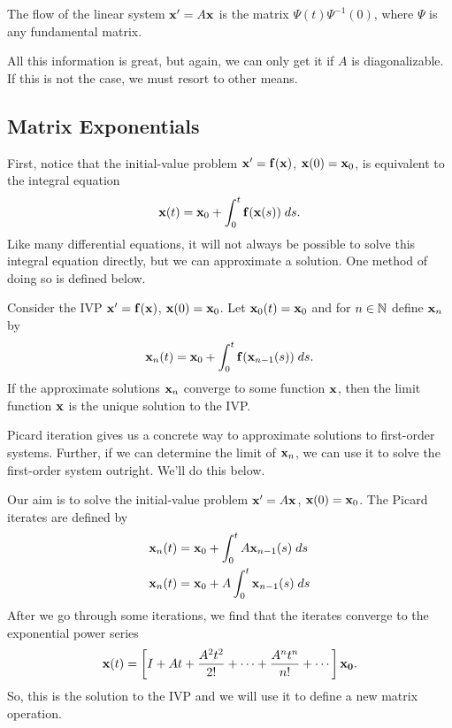 \documentclass[../m082main.tex]{subfiles}
\begin{document}
\begin{definition}
    The flow of the linear system $\mathbf{x}' = A \mathbf{x}$ is the matrix $\Psi(t) \Psi^{-1}(0)$, where $\Psi$ is any fundamental matrix.
\end{definition}

All this information is great, but again, we can only get it if $A$ is diagonalizable.
If this is not the case, we must resort to other means.

\subsection{Matrix Exponentials}
First, notice that the initial-value problem $\mathbf{x}' = \mathbf{f}(\mathbf{x})$, $\mathbf{x}(0) = \mathbf{x}_0$, is equivalent to the integral equation
\[ \mathbf{x}(t) = \mathbf{x}_0 + \int_0^t \mathbf{f}(\mathbf{x}(s))\;ds. \]
Like many differential equations, it will not always be possible to solve this integral equation directly, but we can approximate a solution.
One method of doing so is defined below.

\begin{theorem}
    Consider the IVP $\mathbf{x}' = \mathbf{f}(\mathbf{x})$, $\mathbf{x}(0) = \mathbf{x}_0$.
    Let $\mathbf{x}_0(t) = \mathbf{x}_0$ and for $n \in \mathbb{N}$ define $\mathbf{x}_n$ by
    \[ \mathbf{x}_n(t) = \mathbf{x}_0 + \int_0^t \mathbf{f}(\mathbf{x}_{n-1}(s))\;ds. \]
    If the approximate solutions $\mathbf{x}_n$ converge to some function $\mathbf{x}$, then the limit function $\mathbf{x}$ is the unique solution to the IVP.
\end{theorem}

Picard iteration gives us a concrete way to approximate solutions to first-order systems.
Further, if we can determine the limit of $\mathbf{x}_n$, we can use it to solve the first-order system outright.
We'll do this below.

\begin{example}
    Our aim is to solve the initial-value problem $\mathbf{x}' = A \mathbf{x}$, $\mathbf{x}(0) = \mathbf{x}_0$.
    The Picard iterates are defined by
    \begin{align*}
        \mathbf{x}_n(t) &= \mathbf{x}_0 + \int_0^t A \mathbf{x}_{n-1}(s) \;ds \\
        \mathbf{x}_n(t) &= \mathbf{x}_0 + A \int_0^t \mathbf{x}_{n-1}(s) \;ds
    \end{align*}
    After we go through some iterations, we find that the iterates converge to the exponential power series
    \[ \mathbf{x}(t) = \left[ I + At + \frac{A^2t^2}{2!} + \cdots + \frac{A^nt^n}{n!} + \cdots \right] \mathbf{x_0}. \]
    So, this is the solution to the IVP and we will use it to define a new matrix operation.
\end{example}
\end{document}
